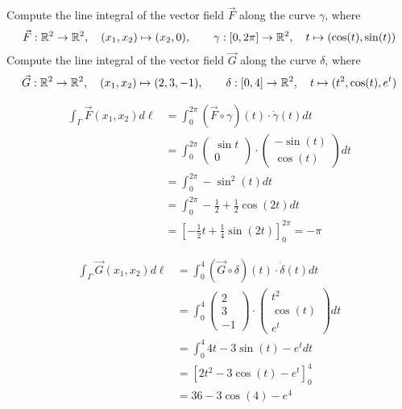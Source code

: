 \documentclass[11pt]{article}
\begin{document}
\begin{exercise}
    Compute the line integral of the vector field $\vec{F}$ along the curve $\gamma$, where 
    \[
        \vec F : \mathbb{R}^2 \to \mathbb{R}^2, \quad (x_1,x_2) \mapsto ( x_2, 0 ), \qquad \gamma : [0,2\pi]  \to \mathbb{R}^2, \quad t \mapsto ( \cos(t), \sin(t) )
    \]
    Compute the line integral of the vector field $\vec{G}$ along the curve $\delta$, where 
    \[
        \vec G : \mathbb{R}^2 \to \mathbb{R}^2, \quad (x_1,x_2) \mapsto ( 2, 3, -1 ), \qquad \delta : [0,4]  \to \mathbb{R}^2, \quad t \mapsto  ( t^2, \cos(t), e^t )
    \]
\end{exercise}
\begin{solution}
\begin{align*}
\int_{\Gamma} \vec{F}(x_1,x_2) d\ell &= \int_{0}^{2\pi} (\vec{F}\circ \gamma)(t)\cdot \dot{\gamma}(t)dt\\
&= \int_{0}^{2\pi} \begin{pmatrix}\sin t\\ 0\end{pmatrix}\cdot \begin{pmatrix} -\sin(t)\\ \cos(t)\end{pmatrix}dt\\
&= \int_{0}^{2\pi}  -\sin^2(t)dt\\
&= \int_{0}^{2\pi}  -\frac{1}{2}+\frac{1}{2}\cos(2t)dt\\
&= \left[-\frac{1}{2}t + \frac{1}{4}\sin(2t)\right]_{0}^{2\pi} = -\pi
\end{align*}

\begin{align*}
\int_{\Gamma} \vec{G}(x_1,x_2) d\ell &= \int_{0}^{4} (\vec{G}\circ \delta)(t)\cdot \dot{\delta}(t)dt\\
&= \int_{0}^{4}\begin{pmatrix} 2\\ 3\\ -1\end{pmatrix} \cdot  \begin{pmatrix}t^2\\ \cos(t) \\ e^t \end{pmatrix}dt\\
&= \int_{0}^{4} 4t - 3\sin(t) - e^t dt\\
&= \left[2t^2 - 3\cos(t) - e^{t} \right]_{0}^{4}\\
&= 36 -3\cos(4)-e^4
\end{align*}
\end{solution}
\end{document}
